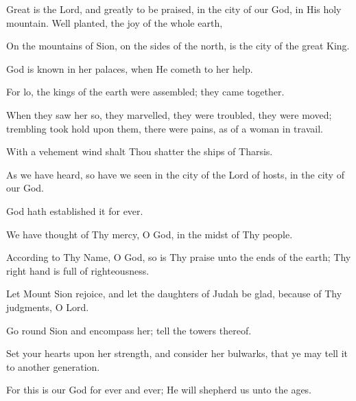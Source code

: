 Great is the Lord, and greatly to be praised, in the city of our God, in His holy mountain. Well planted, the joy of the whole earth,

On the mountains of Sion, on the sides of the north, is the city of the great King.

God is known in her palaces, when He cometh to her help.

For lo, the kings of the earth were assembled; they came together.

When they saw her so, they marvelled, they were troubled, they were moved; trembling took hold upon them, there were pains, as of a woman in travail.

With a vehement wind shalt Thou shatter the ships of Tharsis.

As we have heard, so have we seen in the city of the Lord of hosts, in the city of our God.

God hath established it for ever.

We have thought of Thy mercy, O God, in the midst of Thy people.

According to Thy Name, O God, so is Thy praise unto the ends of the earth; Thy right hand is full of righteousness.

Let Mount Sion rejoice, and let the daughters of Judah be glad, because of Thy judgments, O Lord.

Go round Sion and encompass her; tell the towers thereof.

Set your hearts upon her strength, and consider her bulwarks, that ye may tell it to another generation.

For this is our God for ever and ever; He will shepherd us unto the ages.
